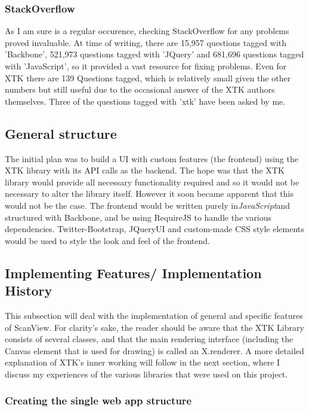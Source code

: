 \documentclass[a4paper,11pt,twoside]{article}
\begin{document}
\subsubsection{StackOverflow}

As I am sure is a regular occurence, checking StackOverflow for any problems proved invaluable. At time of writing, there are 15,957 questions tagged with 'Backbone', 521,973 questions tagged with 'JQuery' and 681,696 questions tagged with 'JavaScript', so it provided a vast resource for fixing problems. Even for XTK there are 139 Questions tagged, which is relatively small given the other numbers but still useful due to the occasional answer of the XTK authors themselves. Three of the questions tagged with 'xtk' have been asked by me.



\subsection{General structure}

The initial plan was to build a UI with custom features (the frontend) using the XTK library with its API calls as the backend. The hope was that the XTK library would provide all necessary functionality required and so it would not be necessary to alter the library itself. However it soon became apparent that this would not be the case. The frontend would be written purely in\textit{JavaScript}and structured with Backbone, and be using RequireJS to handle the various dependencies. Twitter-Bootstrap, JQueryUI and custom-made CSS style elements would be used to style the look and feel of the frontend.




\subsection{Implementing Features/ Implementation History}

This subsection will deal with the implementation of general and specific features of ScanView. For clarity's sake, the reader should be aware that the XTK Library consists of several classes, and that the main rendering interface (including the Canvas element that is used for drawing) is called an X.renderer. A more detailed explanation of XTK's inner working will follow in the next section, where I discuss my experiences of the various libraries that were used on this project.


\subsubsection{Creating the single web app structure}
\end{document}

